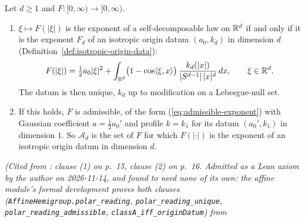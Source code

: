 \begin{theorem}
\label{thm:cited-A35}
\leanok
{}
Let $d \ge 1$ and $F : [0,\infty) \to [0,\infty)$.
\begin{enumerate}
\item $\xi \mapsto F(|\xi|)$ is the exponent of a self-decomposable law on $\mathbb{R}^d$ if and only if
it is the exponent $F_d$ of an isotropic origin datum $(a_0, k_d)$ in dimension $d$
(Definition~\ref{def:isotropic-origin-data}):
\[
  F(|\xi|) = \tfrac12 a_0|\xi|^2 + \int_{\mathbb{R}^d}\bigl(1 - \cos\langle\xi, x\rangle\bigr)\,
  \frac{k_d(|x|)}{|S^{d-1}|\,|x|^d}\,dx, \qquad \xi \in \mathbb{R}^d.
\]
The datum is then unique, $k_d$ up to modification on a Lebesgue-null set.
\item If this holds, $F$ is admissible, of the form (\ref{eq:admissible-exponent}) with Gaussian
coefficient $a = \tfrac12 a_0'$ and profile $k = k_1$ for its datum $(a_0', k_1)$ in dimension $1$. So
$\mathcal{A}_d$ is the set of $F$ for which $F(|\cdot|)$ is the exponent of an isotropic origin
datum in dimension $d$.
\end{enumerate}
\statusA\quad{}\quad\emph{(Cited from :
clause (1) on p.~15, clause (2) on p.~16. Admitted as a Lean axiom by the author on 2026-11-14,
and found to need none of its own: the affine module's formal development proves both clauses
(\texttt{AffineHemigroup.polar\_reading}, \texttt{polar\_reading\_unique},
\texttt{polar\_reading\_admissible}, \texttt{classA\_iff\_originDatum}) from
}
\end{theorem}
